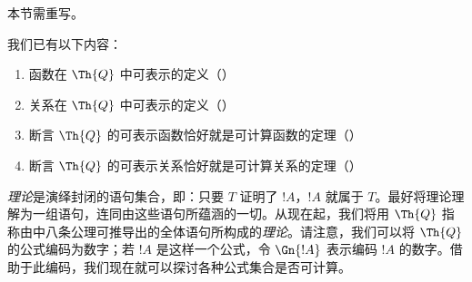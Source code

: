 \documentclass[../../../include/open-logic-section]{subfiles}
\begin{document}


\begin{editorial}
本节需重写。
\end{editorial}

我们已有以下内容：
\begin{enumerate}
\item 函数在 $\Th{Q}$ 中可表示的定义（）
\item 关系在 $\Th{Q}$ 中可表示的定义（）
\item 断言 $\Th{Q}$ 的可表示函数恰好就是可计算函数的定理（）
\item 断言 $\Th{Q}$ 的可表示关系恰好就是可计算关系的定理（）
\end{enumerate}

{\em 理论}是演绎封闭的语句集合，即：只要 $T$ 证明了 $!A$，$!A$ 就属于 $T$。最好将理论理解为一组语句，连同由这些语句所蕴涵的一切。从现在起，我们将用 $\Th{Q}$ 指称由中八条公理可推导出的全体语句所构成的{\em 理论}。请注意，我们可以将 $\Th{Q}$ 的公式编码为数字；若 $!A$ 是这样一个公式，令 $\Gn{!A}$ 表示编码 $!A$ 的数字。借助于此编码，我们现在就可以探讨各种公式集合是否可计算。
\end{document}
